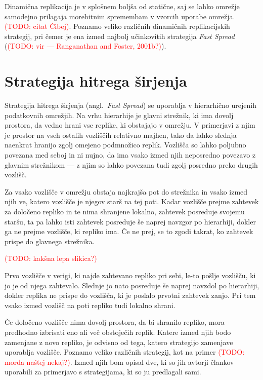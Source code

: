 \documentclass[a4paper, 12pt]{book}
\newcommand{\newterm}{\textit}
\newcommand{\TODO}[1]{\textcolor{red}{(TODO: #1)}}
\begin{document}
Dinamična replikacija je v splošnem boljša od statične, saj se lahko
omre\-žje samodejno prilagaja morebitnim spremembam v vzorcih uporabe omrežja.
\TODO{citat Čibej}. Poznamo veliko različnih dinamičnih replikacijskih
strategij, pri čemer je ena izmed najbolj učinkovitih strategija
\newterm{Fast Spread} (\TODO{vir --- Ranganathan and Foster, 2001b?}).


\section{Strategija hitrega širjenja}

Strategija hitrega širjenja (angl.~\textit{Fast Spread}) se uporablja v
hierarhično urejenih podatkovnih omrežjih. Na vrhu hierarhije je glavni
strežnik, ki ima dovolj prostora, da vedno hrani vse replike, ki obstajajo v
omrežju. V primerjavi z njim je prostor na vseh ostalih vozliščih relativno
majhen, tako da lahko slednja naenkrat hranijo zgolj omejeno podmnožico replik.
Vozlišča so lahko poljubno povezana med seboj in ni nujno, da ima vsako izmed
njih neposredno povezavo z glavnim strežnikom --- z njim so lahko povezana tudi
zgolj posredno preko drugih vozlišč.

Za vsako vozlišče v omrežju obstaja najkrajša pot do strežnika in vsako izmed
njih ve, katero vozlišče je njegov starš na tej poti. Kadar vozlišče prejme
zahtevek za določeno repliko in te nima shranjene lokalno, zahtevek
posreduje svojemu staršu, ta pa lahko isti zahtevek posreduje še naprej
navzgor po hierarhiji, dokler ga ne prejme vozlišče, ki repliko ima. Če ne
prej, se to zgodi takrat, ko zahtevek prispe do glavnega strežnika.

\TODO{kakšna lepa slikica?}

Prvo vozlišče v verigi, ki najde zahtevano repliko pri sebi, le-to pošlje
vozlišču, ki jo je od njega zahtevalo. Slednje jo nato posreduje še naprej
navzdol po hierarhiji, dokler replika ne prispe do vozlišča, ki je poslalo
prvotni zahtevek zanjo. Pri tem vsako izmed vozlišč na poti repliko tudi
lokalno shrani.

Če določeno vozlišče nima dovolj prostora, da bi shranilo repliko,
mora predhodno izbrisati eno ali več obstoječih replik. Katere izmed njih bodo
zamenjane z novo repliko, je odvisno od tega, katero strategijo zamenjave
uporablja vozlišče. Poznamo veliko različnih strategij, kot na primer
\TODO{morda naštej nekaj?}. Izmed njih bom opisal dve, ki so jih avtorji
člankov uporabili za primerjavo s strategijama, ki so ju predlagali sami.
\end{document}
